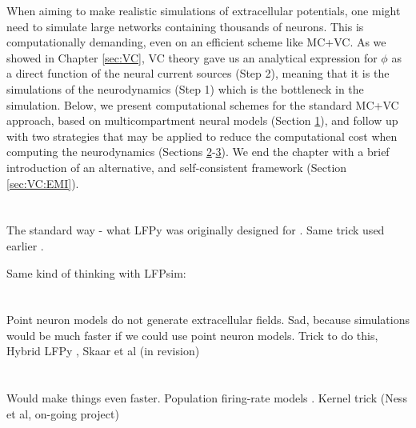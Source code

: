 When aiming to make realistic simulations of extracellular potentials, one might need to simulate large networks containing thousands of neurons. This is computationally demanding, even on an efficient scheme like MC+VC. As we showed in Chapter \ref{sec:VC}, VC theory gave us an analytical expression for $\phi$ as a direct function of the neural current sources (Step 2), meaning that it is the simulations of the neurodynamics (Step 1) which is the bottleneck in the simulation. Below, we present computational schemes for the standard MC+VC approach, based on multicompartment neural models (Section \ref{sec:Schemes:LFPy}), and follow up with two strategies that may be applied to reduce the computational cost when computing the neurodynamics (Sections \ref{sec:Schemes:HybridLFPy}-\ref{sec:Schemes:KernelLFPy}). We end the chapter with a brief introduction of an alternative, and self-consistent framework (Section \ref{sec:VC:EMI}).






\section{}
\label{sec:Schemes:LFPy}

The standard way - what LFPy was originally designed for \cite{Hagen2018}.
Same trick used earlier \cite{Holt1999}.

Same kind of thinking with LFPsim: \cite{parasuram2016}


\section{}
\label{sec:Schemes:HybridLFPy}

Point neuron models do not generate extracellular fields. Sad, because simulations would be much faster if we could use point neuron models. Trick to do this, Hybrid LFPy \cite{Hagen2016}, Skaar et al (in revision)


\section{}
\label{sec:Schemes:KernelLFPy}

Would make things even faster. Population firing-rate models  \cite{Hagen2016}. Kernel trick (Ness et al, on-going project) 


